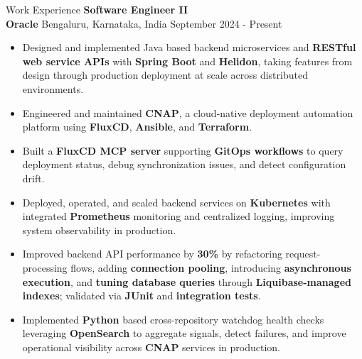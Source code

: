 \documentclass{resume}
\begin{document}
\begin{rSection}{Work Experience}
\textbf{Software Engineer II} \\
\textbf{Oracle} \textbar{} Bengaluru, Karnataka, India \hspace*{\fill} September 2024 - Present
\vspace{-2pt}
\begin{itemize}
    \item Designed and implemented Java based backend microservices and \textbf{RESTful web service APIs} with \textbf{Spring Boot} and \textbf{Helidon}, taking features from design through production deployment at scale across distributed environments.
    \item Engineered and maintained \textbf{CNAP}, a cloud-native deployment automation platform using \textbf{FluxCD}, \textbf{Ansible}, and \textbf{Terraform}.
    \item Built a \textbf{FluxCD MCP server} supporting \textbf{GitOps workflows} to query deployment status, debug synchronization issues, and detect configuration drift.
    \item Deployed, operated, and scaled backend services on \textbf{Kubernetes} with integrated \textbf{Prometheus} monitoring and centralized logging, improving system observability in production.
    \item Improved backend API performance by \textbf{30\%} by refactoring request-processing flows, adding \textbf{connection pooling}, introducing \textbf{asynchronous execution}, and \textbf{tuning database queries} through \textbf{Liquibase-managed indexes}; validated via \textbf{JUnit} and \textbf{integration tests}.
    \item Implemented \textbf{Python} based cross-repository watchdog health checks leveraging \textbf{OpenSearch} to aggregate signals, detect failures, and improve operational visibility across \textbf{CNAP} services in production.
\end{itemize}


\end{rSection}
\end{document}
